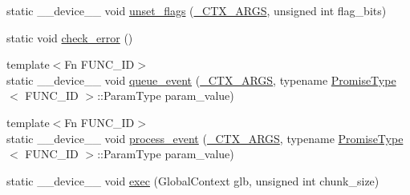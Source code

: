 \begin{DoxyCompactItemize}
static \-\_\-\-\_\-device\-\_\-\-\_\- void \hyperlink{structEventProgram_3_01PromiseUnion_3_01FN__IDS_8_8_8_4_00	PROGRAM__STATE_00	ADR__TYPE_00	GROUP__SIZE_01_4_a02be5276bba98aade9753cf8afa8377a}{unset\-\_\-flags} (\hyperlink{harmonize_8cpp_af53c5ff5aaad0ae06e6d57824cf1611f}{\-\_\-\-C\-T\-X\-\_\-\-A\-R\-G\-S}, unsigned int flag\-\_\-bits)
\item 
static void \hyperlink{structEventProgram_3_01PromiseUnion_3_01FN__IDS_8_8_8_4_00	PROGRAM__STATE_00	ADR__TYPE_00	GROUP__SIZE_01_4_aa79af067f4349f4481ea86ff138075d7}{check\-\_\-error} ()
\item 
{\footnotesize template$<$Fn F\-U\-N\-C\-\_\-\-I\-D$>$ }\\static \-\_\-\-\_\-device\-\_\-\-\_\- void \hyperlink{structEventProgram_3_01PromiseUnion_3_01FN__IDS_8_8_8_4_00	PROGRAM__STATE_00	ADR__TYPE_00	GROUP__SIZE_01_4_ac1ed580aac5a013ec01ffd4e121a1a9f}{queue\-\_\-event} (\hyperlink{harmonize_8cpp_af53c5ff5aaad0ae06e6d57824cf1611f}{\-\_\-\-C\-T\-X\-\_\-\-A\-R\-G\-S}, typename \hyperlink{structPromiseType}{Promise\-Type}$<$ F\-U\-N\-C\-\_\-\-I\-D $>$\-::Param\-Type param\-\_\-value)
\item 
{\footnotesize template$<$Fn F\-U\-N\-C\-\_\-\-I\-D$>$ }\\static \-\_\-\-\_\-device\-\_\-\-\_\- void \hyperlink{structEventProgram_3_01PromiseUnion_3_01FN__IDS_8_8_8_4_00	PROGRAM__STATE_00	ADR__TYPE_00	GROUP__SIZE_01_4_a61876efe2dcb7f085c52259f0a72ecac}{process\-\_\-event} (\hyperlink{harmonize_8cpp_af53c5ff5aaad0ae06e6d57824cf1611f}{\-\_\-\-C\-T\-X\-\_\-\-A\-R\-G\-S}, typename \hyperlink{structPromiseType}{Promise\-Type}$<$ F\-U\-N\-C\-\_\-\-I\-D $>$\-::Param\-Type param\-\_\-value)
\item 
static \-\_\-\-\_\-device\-\_\-\-\_\- void \hyperlink{structEventProgram_3_01PromiseUnion_3_01FN__IDS_8_8_8_4_00	PROGRAM__STATE_00	ADR__TYPE_00	GROUP__SIZE_01_4_aa967935db1434ce32227c44eb0987f35}{exec} (Global\-Context glb, unsigned int chunk\-\_\-size)
\end{DoxyCompactItemize}

